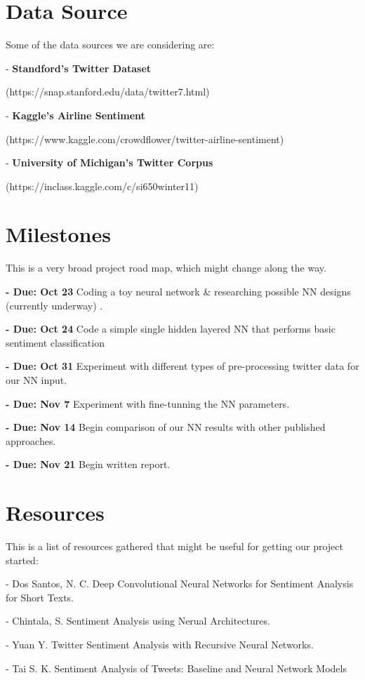 \documentclass[]{article}
\begin{document}
\pagebreak
 
\section{Data Source}
Some of the data sources we are considering are:
\par - \textbf{Standford's Twitter Dataset} 
\par (https://snap.stanford.edu/data/twitter7.html)
\par - \textbf{Kaggle's Airline Sentiment}
\par (https://www.kaggle.com/crowdflower/twitter-airline-sentiment)
\par - \textbf{University of Michigan's Twitter Corpus}
\par (https://inclass.kaggle.com/c/si650winter11)
\section{Milestones}
This is a very broad project road map, which might change along the way.
\par \textbf{- Due: Oct 23} Coding a toy neural network \& researching possible NN designs (currently underway) .
\par \textbf{- Due: Oct 24} Code a simple single hidden layered NN that performs basic sentiment classification
\par \textbf{- Due: Oct 31} Experiment with different types of pre-processing twitter data for our NN input.
\par \textbf{- Due: Nov 7} Experiment with fine-tunning the NN parameters. 
\par \textbf{- Due: Nov 14} Begin comparison of our NN results with other published approaches. 
\par \textbf{- Due: Nov 21} Begin written report.

\section{Resources}
This is a list of resources gathered that might be useful for getting our project started:
\par - Dos Santos, N. C. Deep Convolutional Neural Networks for Sentiment Analysis for Short Texts.
\par - Chintala, S. Sentiment Analysis using Nerual Architectures.
\par - Yuan Y. Twitter Sentiment Analysis with Recursive Neural Networks.
\par - Tai S. K. Sentiment Analysis of Tweets: Baseline and Neural Network Models
\end{document}

